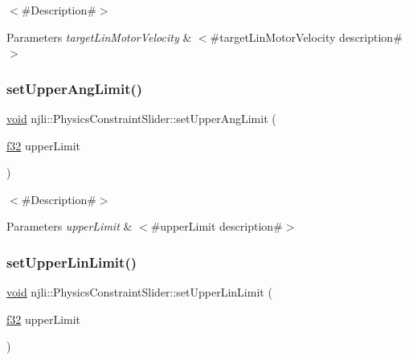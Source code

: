 $<$\#\+Description\#$>$


\begin{DoxyParams}{Parameters}
{\em target\+Lin\+Motor\+Velocity} & $<$\#target\+Lin\+Motor\+Velocity description\#$>$ \\
\hline
\end{DoxyParams}
\mbox{\label{classnjli_1_1_physics_constraint_slider_a01abc657d56a32e5eb36acc2733a7178}} 
\subsubsection{\texorpdfstring{set\+Upper\+Ang\+Limit()}{setUpperAngLimit()}}
{\footnotesize\ttfamily \mbox{\hyperlink{_thread_8h_af1e856da2e658414cb2456cb6f7ebc66}{void}} njli\+::\+Physics\+Constraint\+Slider\+::set\+Upper\+Ang\+Limit (\begin{DoxyParamCaption}\item[{\mbox{\hyperlink{_util_8h_a5f6906312a689f27d70e9d086649d3fd}{f32}}}]{upper\+Limit }\end{DoxyParamCaption})}

$<$\#\+Description\#$>$


\begin{DoxyParams}{Parameters}
{\em upper\+Limit} & $<$\#upper\+Limit description\#$>$ \\
\hline
\end{DoxyParams}
\mbox{\label{classnjli_1_1_physics_constraint_slider_a3ff24369c4200448e7854b3b64943656}} 
\subsubsection{\texorpdfstring{set\+Upper\+Lin\+Limit()}{setUpperLinLimit()}}
{\footnotesize\ttfamily \mbox{\hyperlink{_thread_8h_af1e856da2e658414cb2456cb6f7ebc66}{void}} njli\+::\+Physics\+Constraint\+Slider\+::set\+Upper\+Lin\+Limit (\begin{DoxyParamCaption}\item[{\mbox{\hyperlink{_util_8h_a5f6906312a689f27d70e9d086649d3fd}{f32}}}]{upper\+Limit }\end{DoxyParamCaption})}

